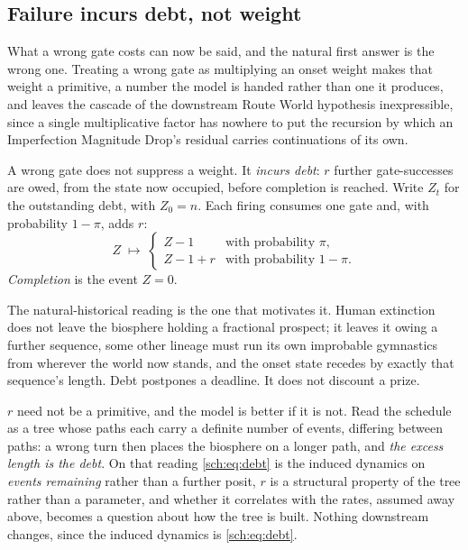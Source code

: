 \subsection{Failure incurs debt, not weight}\label{sch:subsub:debt}

What a wrong gate costs can now be said, and the natural first answer is
the wrong one. Treating a wrong gate as multiplying an onset weight
makes that weight a primitive, a number the model is handed rather
than one it produces, and leaves the cascade of
the downstream Route World hypothesis inexpressible, since a single multiplicative
factor has nowhere to put the recursion by which an Imperfection
Magnitude Drop's residual carries continuations of its own.

\begin{definition}\label{sch:def:debt}
A wrong gate does not suppress a weight. It \emph{incurs debt}: $r$
further gate-successes are owed, from the state now occupied, before
completion is reached. Write $Z_t$ for the outstanding debt, with
$Z_0=n$. Each firing consumes one gate and, with probability $1-\pi$,
adds $r$:
\begin{equation}\label{sch:eq:debt}
Z\;\longmapsto\;
\begin{cases}
Z-1 & \text{with probability }\pi,\\
Z-1+r & \text{with probability }1-\pi .
\end{cases}
\end{equation}
\emph{Completion} is the event $Z=0$.
\end{definition}

The natural-historical reading is the one that motivates it. Human
extinction does not leave the biosphere holding a fractional prospect;
it leaves it owing a further sequence, some other lineage must run
its own improbable gymnastics from wherever the world now stands, and
the onset state recedes by exactly that sequence's length. Debt
postpones a deadline. It does not discount a prize.

$r$ need not be a primitive, and the model is better if it is not. Read
the schedule as a tree whose paths each carry a definite number of
events, differing between paths: a wrong turn then places the biosphere
on a longer path, and \emph{the excess length is the debt}. On that
reading \eqref{sch:eq:debt} is the induced dynamics on \emph{events
remaining} rather than a further posit, $r$ is a structural property of
the tree rather than a parameter, and whether it correlates with the
rates, assumed away above, becomes a question about how the tree
is built. Nothing downstream changes, since the induced dynamics is
\eqref{sch:eq:debt}.

